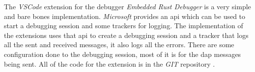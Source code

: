 The \emph{VSCode} extension for the debugger \emph{Embedded Rust Debugger} is a very simple and bare bones implementation.
\emph{Microsoft} provides an \gls{api} which can be used to start a debugging session and some trackers for logging.
The implementation of the extensions uses that \gls{api} to create a debugging session and a tracker that logs all the sent and received messages, it also logs all the errors.
There are some configuration done to the debugging session, most of it is for the \gls{dap} messages being sent.
All of the code for the extension is in the \emph{GIT} repository \cite{erd-vscode}.

